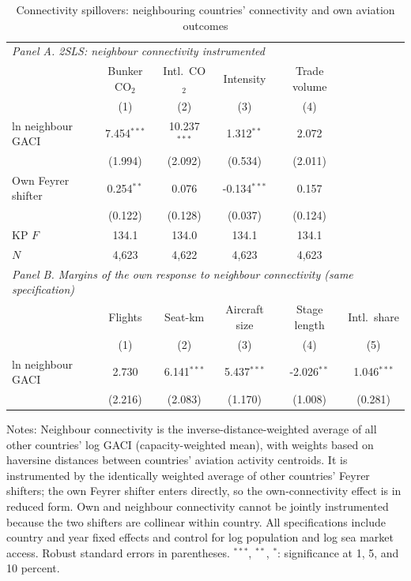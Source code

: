 \documentclass[12pt]{article}
\begin{document}
\begin{table}[htbp]
\centering
\begin{threeparttable}
\caption{Connectivity spillovers: neighbouring countries' connectivity and own aviation outcomes}
\label{tab:spillover}
\footnotesize
\begin{tabular}{lccccc}
\toprule
\multicolumn{6}{l}{\textit{Panel A. 2SLS: neighbour connectivity instrumented}} \\
 & \multicolumn{1}{c}{Bunker CO$_2$} & \multicolumn{1}{c}{Intl.\ CO$_2$} & \multicolumn{1}{c}{Intensity} & \multicolumn{1}{c}{Trade volume} & \\
 & (1) & (2) & (3) & (4) & \\
\midrule
  ln neighbour GACI & 7.454$^{***}$ & 10.237$^{***}$ & 1.312$^{**}$ & 2.072 & \\
   & (1.994) & (2.092) & (0.534) & (2.011) & \\
  Own Feyrer shifter & 0.254$^{**}$ & 0.076 & -0.134$^{***}$ & 0.157 & \\
   & (0.122) & (0.128) & (0.037) & (0.124) & \\
  KP $F$ & 134.1 & 134.0 & 134.1 & 134.1 & \\
  $N$ & 4,623 & 4,622 & 4,623 & 4,623 & \\
\midrule
\multicolumn{6}{l}{\textit{Panel B. Margins of the own response to neighbour connectivity (same specification)}} \\
 & \multicolumn{1}{c}{Flights} & \multicolumn{1}{c}{Seat-km} & \multicolumn{1}{c}{Aircraft size} & \multicolumn{1}{c}{Stage length} & \multicolumn{1}{c}{Intl.\ share} \\
 & (1) & (2) & (3) & (4) & (5) \\
\midrule
  ln neighbour GACI & 2.730 & 6.141$^{***}$ & 5.437$^{***}$ & -2.026$^{**}$ & 1.046$^{***}$ \\
   & (2.216) & (2.083) & (1.170) & (1.008) & (0.281) \\
\bottomrule
\end{tabular}
\begin{tablenotes}[flushleft]
\footnotesize
\item Notes: Neighbour connectivity is the inverse-distance-weighted average of all other countries' log GACI (capacity-weighted mean), with weights based on haversine distances between countries' aviation activity centroids. It is instrumented by the identically weighted average of other countries' Feyrer shifters; the own Feyrer shifter enters directly, so the own-connectivity effect is in reduced form. Own and neighbour connectivity cannot be jointly instrumented because the two shifters are collinear within country. All specifications include country and year fixed effects and control for log population and log sea market access. Robust standard errors in parentheses. $^{***}$, $^{**}$, $^{*}$: significance at 1, 5, and 10 percent.
\end{tablenotes}
\end{threeparttable}
\end{table}
\end{document}

